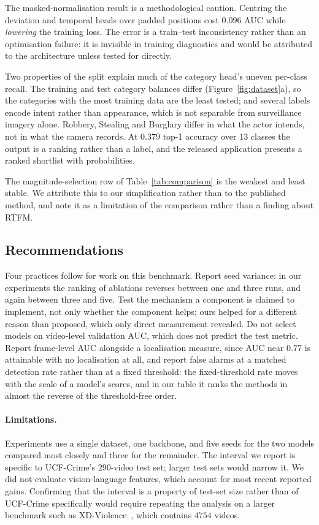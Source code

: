 \documentclass[11pt]{article}
\begin{document}
The masked-normalisation result is a methodological caution. Centring the
deviation and temporal heads over padded positions cost $0.096$ AUC while
\emph{lowering} the training loss. The error is a train--test inconsistency rather
than an optimisation failure: it is invisible in training diagnostics and would be
attributed to the architecture unless tested for directly.

Two properties of the split explain much of the category head's uneven per-class
recall. The training and test category balances differ
(Figure~\ref{fig:dataset}a), so the categories with the most training data are the
least tested; and several labels encode intent rather than appearance, which is
not separable from surveillance imagery alone. Robbery, Stealing and Burglary
differ in what the actor intends, not in what the camera records. At $0.379$ top-1
accuracy over $13$ classes the output is a ranking rather than a label, and the
released application presents a ranked shortlist with probabilities.

The magnitude-selection row of Table~\ref{tab:comparison} is the weakest and least
stable. We attribute this to our simplification rather than to the published
method, and note it as a limitation of the comparison rather than a finding about
RTFM.

\subsection{Recommendations}

Four practices follow for work on this benchmark. Report seed variance: in our
experiments the ranking of ablations reverses between one and three runs, and
again between three and five. Test the mechanism a component is claimed to
implement, not only whether the component helps; ours helped for a different
reason than proposed, which only direct measurement revealed. Do not select models on
video-level validation AUC, which does not predict the test metric. Report
frame-level AUC alongside a localisation measure, since AUC near $0.77$ is
attainable with no localisation at all, and report false alarms at a matched
detection rate rather than at a fixed threshold: the fixed-threshold rate moves
with the scale of a model's scores, and in our table it ranks the methods in
almost the reverse of the threshold-free order.

\paragraph{Limitations.} Experiments use a single dataset, one backbone, and
five seeds for the two models compared most closely and three for the remainder. The interval we report is specific to UCF-Crime's $290$-video test set;
larger test sets would narrow it. We did not evaluate vision-language features,
which account for most recent reported gains. Confirming that the interval is a
property of test-set size rather than of UCF-Crime specifically would require
repeating the analysis on a larger benchmark such as
XD-Violence~\citep{wu2020not}, which contains $4754$ videos.
\end{document}
